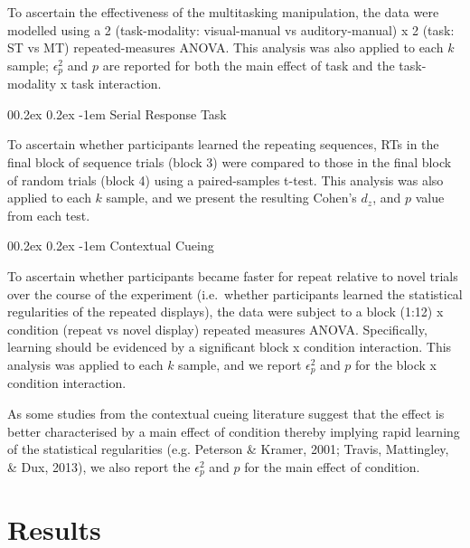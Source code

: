 \documentclass[
  man]{apa6}
\makeatletter
\let\oldparagraph\paragraph
\renewcommand{\paragraph}[1]{\oldparagraph{#1}\mbox{}}
\renewcommand{\paragraph}{\@startsection{paragraph}{4}{\parindent}%
  {0\baselineskip \@plus 0.2ex \@minus 0.2ex}%
  {-1em}%
  {\normalfont\normalsize\bfseries\itshape\typesectitle}}
\makeatother
\begin{document}
To ascertain the effectiveness of the multitasking manipulation, the data were modelled using a 2 (task-modality: visual-manual vs auditory-manual) x 2 (task: ST vs MT) repeated-measures ANOVA. This analysis was also applied to each \(k\) sample; \(\epsilon_{p}^2\) and \(p\) are reported for both the main effect of task and the task-modality x task interaction.

\hypertarget{serial-response-task}{%
\paragraph{Serial Response Task}\label{serial-response-task}}

To ascertain whether participants learned the repeating sequences, RTs in the final block of sequence trials (block 3) were compared to those in the final block of random trials (block 4) using a paired-samples t-test. This analysis was also applied to each \(k\) sample, and we present the resulting Cohen's \(d_{z}\), and \(p\) value from each test.

\hypertarget{contextual-cueing}{%
\paragraph{Contextual Cueing}\label{contextual-cueing}}

To ascertain whether participants became faster for repeat relative to novel trials over the course of the experiment (i.e.~whether participants learned the statistical regularities of the repeated displays), the data were subject to a block (1:12) x condition (repeat vs novel display) repeated measures ANOVA. Specifically, learning should be evidenced by a significant block x condition interaction. This analysis was applied to each \(k\) sample, and we report \(\epsilon_{p}^2\) and \(p\) for the block x condition interaction.

As some studies from the contextual cueing literature suggest that the effect is better characterised by a main effect of condition thereby implying rapid learning of the statistical regularities (e.g. Peterson \& Kramer, 2001; Travis, Mattingley, \& Dux, 2013), we also report the \(\epsilon_{p}^2\) and \(p\) for the main effect of condition.

\hypertarget{results}{%
\section{Results}\label{results}}
\end{document}
